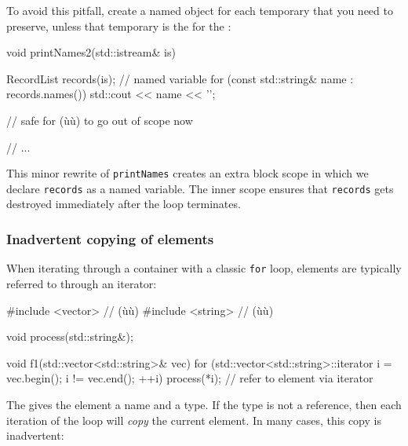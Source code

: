 {{{To avoid this pitfall, create a named object for each temporary that you
need to preserve, unless that temporary is the 
for the :

\begin{emcppslisting}[emcppsbatch=e4]
void printNames2(std::istream& is)
{
    {
        RecordList records(is);  // named variable
        for (const std::string& name : records.names())
        {
            std::cout << name << '\n';
        }

        // safe for (ù{}ù) to go out of scope now
    }

    // ...
}
\end{emcppslisting}
    

\noindent This minor rewrite of \lstinline!printNames! creates an extra block scope
in which we declare \lstinline!records! as a named variable. The inner
scope ensures that \lstinline!records! gets destroyed immediately after the
loop terminates.

\subsubsection[Inadvertent copying of elements]{Inadvertent copying of elements}\label{inadvertent-copying-of-elements}

When iterating through a container with a classic \lstinline!for! loop,
elements are typically referred to through an iterator:

\begin{emcppshiddenlisting}[emcppsbatch=e5]
#include <vector>  // (ù{}ù)
#include <string>  // (ù{}ù)
\end{emcppshiddenlisting}
\begin{emcppslisting}[emcppsbatch=e5]
void process(std::string&);

void f1(std::vector<std::string>& vec)
{
    for (std::vector<std::string>::iterator i = vec.begin();
         i != vec.end(); ++i)
    {
        process(*i);  // refer to element via iterator
    }
}
\end{emcppslisting}
    

\noindent The  gives the element a name and
a type. If the type is not a reference, then each iteration of the loop
will \emph{copy} the current element. In many cases, this copy is
inadvertent:

}}}
